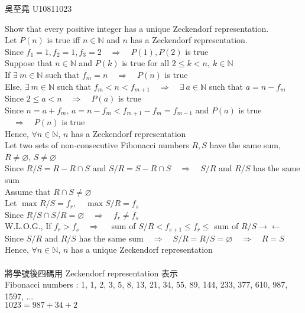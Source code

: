 \documentclass[12pt]{book}
\author{andersonwu2000}
\begin{document}
\begin{CJK}{UTF8}{bsmi}

\hfill 吳至堯 U10811023

Show that every positive integer has a unique Zeckendorf representation. \\
Let $P(n)$ is true iff $n\in\mathbb{N}$ and $n$ has a Zeckendorf representation. \\
Since $f_1=1, f_2=1, f_3=2\quad\Rightarrow\quad P(1), P(2)$ is true \\
Suppose that $n\in\mathbb{N}$ and $P(k)$ is true for all $2\le k<n,\ k\in\mathbb{N}$ \\
If $\exists\ m\in\mathbb{N}$ such that $f_m=n\quad\Rightarrow\quad P(n)$ is true \\
Else, $\exists\ m\in\mathbb{N}$ such that $f_m<n<f_{m+1}\quad\Rightarrow\quad\exists\ a\in\mathbb{N}$ such that $a=n-f_m$ \\
Since $2\le a<n\quad\Rightarrow\quad P(a)$ is true \\
Since $n=a+f_m$, $a=n-f_m<f_{m+1}-f_m=f_{m-1}$ and $P(a)$ is true $\quad\Rightarrow\quad P(n)$ is true \\
Hence, $\forall n\in\mathbb{N}$, $n$ has a Zeckendorf representation \\
Let two sets of non-consecutive Fibonacci numbers $R, S$ have the same sum, $R\ne\varnothing$, $S\ne\varnothing$ \\
Since $R/S=R-R\cap S$ and $S/R=S-R\cap S\quad\Rightarrow\quad S/R$ and $R/S$ has the same sum \\
Assume that $R\cap S\ne\varnothing$ \\
Let $\max R/S=f_r,\quad\max S/R=f_s$ \\
Since $R/S\cap S/R=\varnothing\quad\Rightarrow\quad f_r\ne f_s$ \\
W.L.O.G., If $f_r>f_s\quad\Rightarrow\quad$ sum of $S/R<f_{s+1}\le f_r\le$ sum of $R/S\rightarrow\leftarrow$ \\
Since $S/R$ and $R/S$ has the same sum$\quad\Rightarrow\quad S/R=R/S=\varnothing\quad\Rightarrow\quad R=S$ \\
Hence, $\forall n\in\mathbb{N}$, $n$ has a unique Zeckendorf representation \\\\

將學號後四碼用 Zeckendorf representation 表示 \\
Fibonacci numbers : 1, 1, 2, 3, 5, 8, 13, 21, 34, 55, 89, 144, 233, 377, 610, 987, 1597, ... \\
$1023 = 987+34+2$
\end{CJK}
\end{document}
